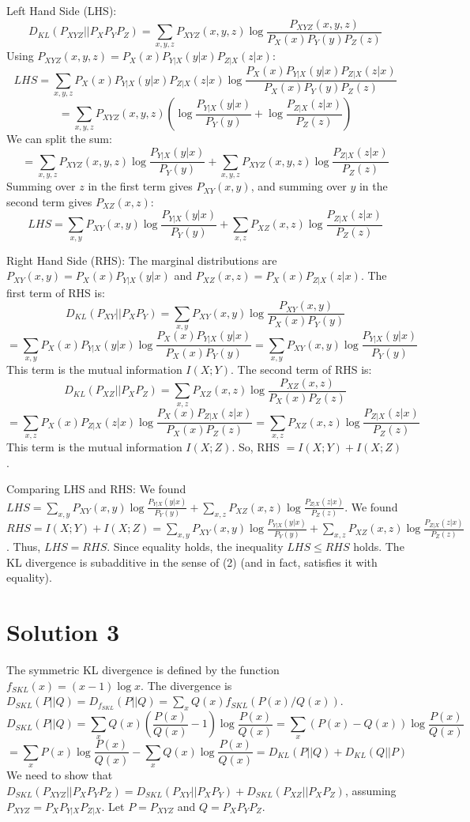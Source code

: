 \documentclass{article}
\begin{document}
Left Hand Side (LHS):
\[ D_{KL}(P_{XYZ} || P_X P_Y P_Z) = \sum_{x,y,z} P_{XYZ}(x,y,z) \log \frac{P_{XYZ}(x,y,z)}{P_X(x) P_Y(y) P_Z(z)} \]
Using $P_{XYZ}(x,y,z) = P_X(x) P_{Y|X}(y|x) P_{Z|X}(z|x)$:
\[ LHS = \sum_{x,y,z} P_X(x) P_{Y|X}(y|x) P_{Z|X}(z|x) \log \frac{P_X(x) P_{Y|X}(y|x) P_{Z|X}(z|x)}{P_X(x) P_Y(y) P_Z(z)} \]
\[ = \sum_{x,y,z} P_{XYZ}(x,y,z) \left( \log \frac{P_{Y|X}(y|x)}{P_Y(y)} + \log \frac{P_{Z|X}(z|x)}{P_Z(z)} \right) \]
We can split the sum:
\[ = \sum_{x,y,z} P_{XYZ}(x,y,z) \log \frac{P_{Y|X}(y|x)}{P_Y(y)} + \sum_{x,y,z} P_{XYZ}(x,y,z) \log \frac{P_{Z|X}(z|x)}{P_Z(z)} \]
Summing over $z$ in the first term gives $P_{XY}(x,y)$, and summing over $y$ in the second term gives $P_{XZ}(x,z)$:
\[ LHS = \sum_{x,y} P_{XY}(x,y) \log \frac{P_{Y|X}(y|x)}{P_Y(y)} + \sum_{x,z} P_{XZ}(x,z) \log \frac{P_{Z|X}(z|x)}{P_Z(z)} \]

Right Hand Side (RHS):
The marginal distributions are $P_{XY}(x,y) = P_X(x) P_{Y|X}(y|x)$ and $P_{XZ}(x,z) = P_X(x) P_{Z|X}(z|x)$.
The first term of RHS is:
\[ D_{KL}(P_{XY} || P_X P_Y) = \sum_{x,y} P_{XY}(x,y) \log \frac{P_{XY}(x,y)}{P_X(x) P_Y(y)} \]
\[ = \sum_{x,y} P_X(x) P_{Y|X}(y|x) \log \frac{P_X(x) P_{Y|X}(y|x)}{P_X(x) P_Y(y)} = \sum_{x,y} P_{XY}(x,y) \log \frac{P_{Y|X}(y|x)}{P_Y(y)} \]
This term is the mutual information $I(X;Y)$.
The second term of RHS is:
\[ D_{KL}(P_{XZ} || P_X P_Z) = \sum_{x,z} P_{XZ}(x,z) \log \frac{P_{XZ}(x,z)}{P_X(x) P_Z(z)} \]
\[ = \sum_{x,z} P_X(x) P_{Z|X}(z|x) \log \frac{P_X(x) P_{Z|X}(z|x)}{P_X(x) P_Z(z)} = \sum_{x,z} P_{XZ}(x,z) \log \frac{P_{Z|X}(z|x)}{P_Z(z)} \]
This term is the mutual information $I(X;Z)$.
So, RHS $= I(X;Y) + I(X;Z)$.

Comparing LHS and RHS:
We found $LHS = \sum_{x,y} P_{XY}(x,y) \log \frac{P_{Y|X}(y|x)}{P_Y(y)} + \sum_{x,z} P_{XZ}(x,z) \log \frac{P_{Z|X}(z|x)}{P_Z(z)}$.
We found $RHS = I(X;Y) + I(X;Z) = \sum_{x,y} P_{XY}(x,y) \log \frac{P_{Y|X}(y|x)}{P_Y(y)} + \sum_{x,z} P_{XZ}(x,z) \log \frac{P_{Z|X}(z|x)}{P_Z(z)}$.
Thus, $LHS = RHS$.
Since equality holds, the inequality $LHS \le RHS$ holds. The KL divergence is subadditive in the sense of (2) (and in fact, satisfies it with equality).

\section*{Solution 3}
The symmetric KL divergence is defined by the function $f_{SKL}(x) = (x-1) \log x$. The divergence is $D_{SKL}(P||Q) = D_{f_{SKL}}(P||Q) = \sum_x Q(x) f_{SKL}(P(x)/Q(x))$.
\[ D_{SKL}(P||Q) = \sum_x Q(x) \left( \frac{P(x)}{Q(x)} - 1 \right) \log \frac{P(x)}{Q(x)} = \sum_x (P(x) - Q(x)) \log \frac{P(x)}{Q(x)} \]
\[ = \sum_x P(x) \log \frac{P(x)}{Q(x)} - \sum_x Q(x) \log \frac{P(x)}{Q(x)} = D_{KL}(P||Q) + D_{KL}(Q||P) \]
We need to show that $D_{SKL}(P_{XYZ} || P_X P_Y P_Z) = D_{SKL}(P_{XY} || P_X P_Y) + D_{SKL}(P_{XZ} || P_X P_Z)$, assuming $P_{XYZ} = P_X P_{Y|X} P_{Z|X}$. Let $P = P_{XYZ}$ and $Q = P_X P_Y P_Z$.
\end{document}
